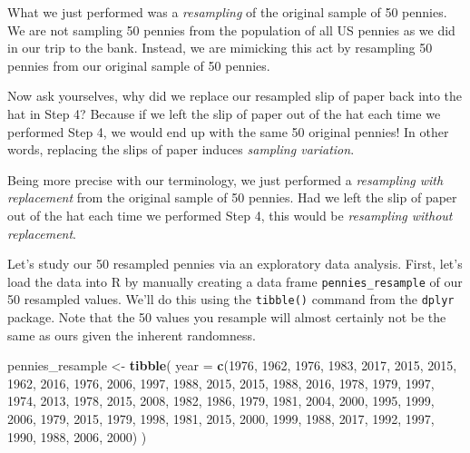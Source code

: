 \documentclass[
]{book}
\newenvironment{Shaded}{\begin{snugshade}}{\end{snugshade}}
\newcommand{\DataTypeTok}[1]{\textcolor[rgb]{0.13,0.29,0.53}{#1}}
\newcommand{\DecValTok}[1]{\textcolor[rgb]{0.00,0.00,0.81}{#1}}
\newcommand{\KeywordTok}[1]{\textcolor[rgb]{0.13,0.29,0.53}{\textbf{#1}}}
\newcommand{\NormalTok}[1]{#1}
\newcommand{\StringTok}[1]{\textcolor[rgb]{0.31,0.60,0.02}{#1}}
\begin{document}
What we just performed was a \emph{resampling}  of the original sample of 50 pennies. We are not sampling 50 pennies from the population of all US pennies as we did in our trip to the bank. Instead, we are mimicking this act by resampling 50 pennies from our original sample of 50 pennies.

Now ask yourselves, why did we replace our resampled slip of paper back into the hat in Step 4? Because if we left the slip of paper out of the hat each time we performed Step 4, we would end up with the same 50 original pennies! In other words, replacing the slips of paper induces \emph{sampling variation}.

Being more precise with our terminology, we just performed a \emph{resampling with replacement} from the original sample of 50 pennies. Had we left the slip of paper out of the hat each time we performed Step 4, this would be \emph{resampling without replacement}.

Let's study our 50 resampled pennies via an exploratory data analysis. First, let's load the data into R by manually creating a data frame \texttt{pennies\_resample} of our 50 resampled values. We'll do this using the \texttt{tibble()} command from the \texttt{dplyr} package. Note that the 50 values you resample will almost certainly not be the same as ours given the inherent randomness.

\begin{Shaded}
\begin{Highlighting}[]
\NormalTok{pennies_resample <-}\StringTok{ }\KeywordTok{tibble}\NormalTok{(}
  \DataTypeTok{year =} \KeywordTok{c}\NormalTok{(}\DecValTok{1976}\NormalTok{, }\DecValTok{1962}\NormalTok{, }\DecValTok{1976}\NormalTok{, }\DecValTok{1983}\NormalTok{, }\DecValTok{2017}\NormalTok{, }\DecValTok{2015}\NormalTok{, }\DecValTok{2015}\NormalTok{, }\DecValTok{1962}\NormalTok{, }\DecValTok{2016}\NormalTok{, }\DecValTok{1976}\NormalTok{, }
           \DecValTok{2006}\NormalTok{, }\DecValTok{1997}\NormalTok{, }\DecValTok{1988}\NormalTok{, }\DecValTok{2015}\NormalTok{, }\DecValTok{2015}\NormalTok{, }\DecValTok{1988}\NormalTok{, }\DecValTok{2016}\NormalTok{, }\DecValTok{1978}\NormalTok{, }\DecValTok{1979}\NormalTok{, }\DecValTok{1997}\NormalTok{, }
           \DecValTok{1974}\NormalTok{, }\DecValTok{2013}\NormalTok{, }\DecValTok{1978}\NormalTok{, }\DecValTok{2015}\NormalTok{, }\DecValTok{2008}\NormalTok{, }\DecValTok{1982}\NormalTok{, }\DecValTok{1986}\NormalTok{, }\DecValTok{1979}\NormalTok{, }\DecValTok{1981}\NormalTok{, }\DecValTok{2004}\NormalTok{, }
           \DecValTok{2000}\NormalTok{, }\DecValTok{1995}\NormalTok{, }\DecValTok{1999}\NormalTok{, }\DecValTok{2006}\NormalTok{, }\DecValTok{1979}\NormalTok{, }\DecValTok{2015}\NormalTok{, }\DecValTok{1979}\NormalTok{, }\DecValTok{1998}\NormalTok{, }\DecValTok{1981}\NormalTok{, }\DecValTok{2015}\NormalTok{, }
           \DecValTok{2000}\NormalTok{, }\DecValTok{1999}\NormalTok{, }\DecValTok{1988}\NormalTok{, }\DecValTok{2017}\NormalTok{, }\DecValTok{1992}\NormalTok{, }\DecValTok{1997}\NormalTok{, }\DecValTok{1990}\NormalTok{, }\DecValTok{1988}\NormalTok{, }\DecValTok{2006}\NormalTok{, }\DecValTok{2000}\NormalTok{)}
\NormalTok{)}
\end{Highlighting}
\end{Shaded}
\end{document}
